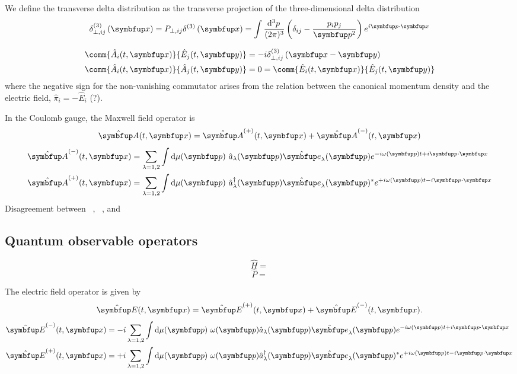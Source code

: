 We define the transverse delta distribution as the transverse projection of the three-dimensional delta distribution
\begin{equation}
	\delta_{\perp,ij}^{(3)}
	\left(\vb{x}\right)
	=
	P_{\perp,ij}
	\delta^{(3)}
	\left(\vb{x}\right)
	=
	\int\frac{\dd[3]{p}}{(2\pi)^3}
	\left(
		\delta_{ij}
		-
		\frac{p_ip_j}{\vb{p}^2}
	\right)
	e^{i\vb{p}\vdot\vb{x}}
\end{equation}

\begin{align}
	\comm{\hat{A}_i(t,\vb{x})}{\hat{E}_j(t,\vb{y})}
	&=
	-i
	\delta_{\perp,ij}^{(3)}
	\left(\vb{x}-\vb{y}\right)
	\\
	\comm{\hat{A}_i(t,\vb{x})}{\hat{A}_j(t,\vb{y})}
	&=
	0
	=
	\comm{\hat{E}_i(t,\vb{x})}{\hat{E}_j(t,\vb{y})}
\end{align}
where the negative sign for the non-vanishing commutator arises from the relation between the canonical momentum density and the electric field, $\hat\pi_i=-\hat{E}_i$ (?).

In the Coulomb gauge, the Maxwell field operator is
\begin{equation}
	\vu{A}(t,\vb{x})
	=
	\vu{A}^{(+)}(t,\vb{x})
	+
	\vu{A}^{(-)}(t,\vb{x})
\end{equation}
\begin{align}
	\vu{A}^{(-)}(t,\vb{x})
	&=
	\sum_{\lambda=1,2}
	\int\dd{\mu(\vb{p})}
	\hat{a}_\lambda(\vb{p})
	\vu{e}_\lambda(\vb{p})
	e^{-i\omega(\vb{p})t+i\vb{p}\vdot\vb{x}}
	\\
	\vu{A}^{(+)}(t,\vb{x})
	&=
	\sum_{\lambda=1,2}
	\int\dd{\mu(\vb{p})}
	\hat{a}_\lambda^\dagger(\vb{p})
	\vu{e}_\lambda(\vb{p})^*
	e^{+i\omega(\vb{p})t-i\vb{p}\vdot\vb{x}}
\end{align}
Disagreement between ~\cite[p.~341]{Srednicki2007}, ~\cite[p.~198]{Greiner2013}, and \cite[p.~123]{Peskin1995}

\subsection{Quantum observable operators}

\begin{equation}
	\hat{H}
	=
\end{equation}
\begin{equation}
	\hat{P}
	=
\end{equation}

The electric field operator is given by
\begin{equation}
	\vu{E}(t,\vb{x})
	=
	\vu{E}^{(+)}(t,\vb{x})
	+
	\vu{E}^{(-)}(t,\vb{x})
	.
\end{equation}
\begin{align}
	\vu{E}^{(-)}(t,\vb{x})
	&=
	-i
	\sum_{\lambda=1,2}
	\int\dd{\mu(\vb{p})}
	\omega(\vb{p})
	\hat{a}_\lambda(\vb{p})
	\vu{e}_\lambda(\vb{p})
	e^{-i\omega(\vb{p})t+i\vb{p}\vdot\vb{x}}
	\\
	\vu{E}^{(+)}(t,\vb{x})
	&=
	+i
	\sum_{\lambda=1,2}
	\int\dd{\mu(\vb{p})}
	\omega(\vb{p})
	\hat{a}_\lambda^\dagger(\vb{p})
	\vu{e}_\lambda(\vb{p})^*
	e^{+i\omega(\vb{p})t-i\vb{p}\vdot\vb{x}}
\end{align}